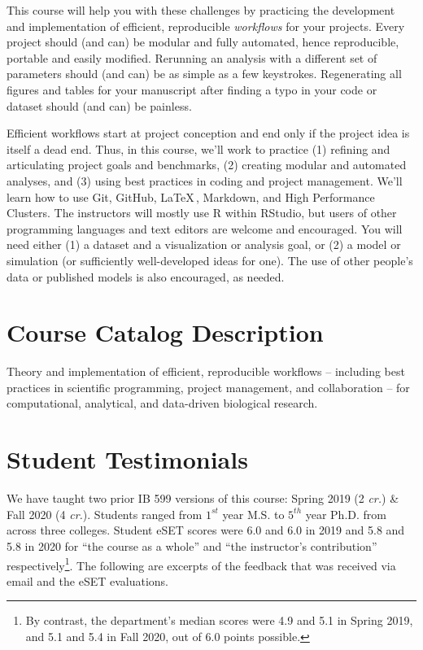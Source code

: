 \documentclass[10pt]{article}
\begin{document}
This course will help you with these challenges by practicing the development and implementation of 
efficient, reproducible \emph{workflows} for your projects.  
Every project should (and can) be modular and fully automated, hence reproducible, portable and easily 
modified.  
Rerunning an analysis with a different set of parameters should (and can) be as simple as a few 
keystrokes. 
Regenerating all figures and tables for your manuscript after finding a typo in your code or dataset 
should (and can) be painless.

Efficient workflows start at project conception and end only if the project idea is itself a dead end.  
Thus, in this course, we'll work to practice 
(1) refining and articulating project goals and benchmarks, 
(2) creating modular and automated analyses, and 
(3) using best practices in coding and project management. 
We'll learn how to use Git, GitHub, \LaTeX\,, Markdown, and High Performance Clusters.
The instructors will mostly use \textsf{R} within RStudio, but users of other programming languages and 
text editors are welcome and encouraged.  
You will need either 
(1) a dataset and a visualization or analysis goal, or 
(2) a model or simulation (or sufficiently well-developed ideas for one).
The use of other people's data or published models is also encouraged, as needed.

\section*{Course Catalog Description}
Theory and implementation of efficient, reproducible workflows -- including best practices in scientific 
programming, project management, and collaboration --  for computational, analytical, and data-driven 
biological research.

\section*{Student Testimonials}
We have taught two prior IB 599 versions of this course: Spring 2019 (2 \emph{cr.}) \& Fall 2020 (4 
\emph{cr.}).
Students ranged from $1^{st}$ year M.S. to $5^{th}$ year Ph.D. from across three colleges. 
Student eSET scores were 6.0 and 6.0 in 2019 and 5.8 and 5.8 in 2020 for ``the course as a whole'' and 
``the instructor's contribution'' respectively\footnote{By contrast, the department's median scores were 
4.9 and 5.1 in Spring 2019, and 5.1 and 5.4 in Fall 2020, out of 6.0 points possible.}.
The following are excerpts of the feedback that was received via email and the eSET evaluations.
\end{document}
